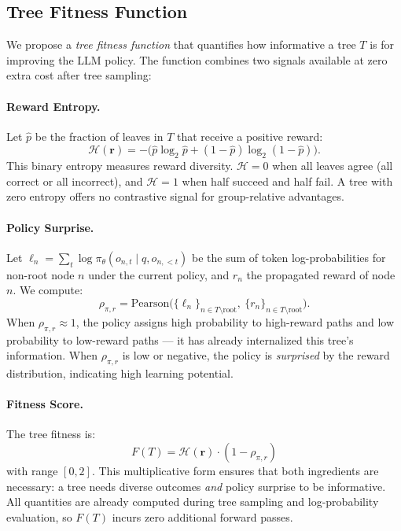 \documentclass{article} %
\begin{document}
\subsection{Tree Fitness Function}
\label{sec:fitness}

We propose a \emph{tree fitness function} that quantifies how informative a tree $T$ is for improving the LLM policy. The function combines two signals available at zero extra cost after tree sampling:

\paragraph{Reward Entropy.} Let $\hat{p}$ be the fraction of leaves in $T$ that receive a positive reward:
\begin{equation}
    \mathcal{H}(\mathbf{r}) = -\big(\hat{p} \log_2 \hat{p} + (1 - \hat{p}) \log_2 (1 - \hat{p})\big).
    \label{eq:entropy}
\end{equation}
This binary entropy measures reward diversity. $\mathcal{H} = 0$ when all leaves agree (all correct or all incorrect), and $\mathcal{H} = 1$ when half succeed and half fail. A tree with zero entropy offers no contrastive signal for group-relative advantages.

\paragraph{Policy Surprise.} Let $\ell_n = \sum_t \log \pi_\theta(o_{n,t} \mid q, o_{n,<t})$ be the sum of token log-probabilities for non-root node $n$ under the current policy, and $r_n$ the propagated reward of node $n$. We compute:
\begin{equation}
    \rho_{\pi,r} = \text{Pearson}\big(\{\ell_n\}_{n \in T \setminus \text{root}},\ \{r_n\}_{n \in T \setminus \text{root}}\big).
    \label{eq:rho}
\end{equation}
When $\rho_{\pi,r} \approx 1$, the policy assigns high probability to high-reward paths and low probability to low-reward paths --- it has already internalized this tree's information. When $\rho_{\pi,r}$ is low or negative, the policy is \emph{surprised} by the reward distribution, indicating high learning potential.

\paragraph{Fitness Score.} The tree fitness is:
\begin{equation}
    \boxed{F(T) = \mathcal{H}(\mathbf{r}) \cdot (1 - \rho_{\pi,r})}
    \label{eq:fitness}
\end{equation}
with range $[0, 2]$. This multiplicative form ensures that both ingredients are necessary: a tree needs diverse outcomes \emph{and} policy surprise to be informative. All quantities are already computed during tree sampling and log-probability evaluation, so $F(T)$ incurs zero additional forward passes.
\end{document}
